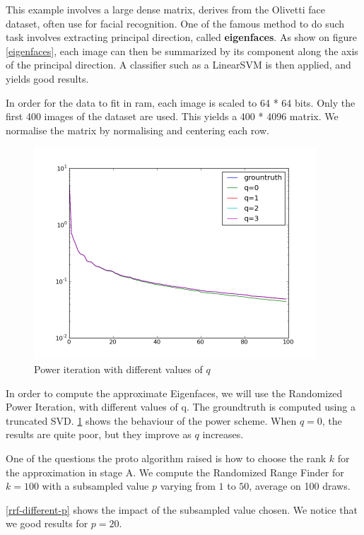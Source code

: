\documentclass[onecolumn,12pt]{article}
\begin{document}
This example involves a large dense matrix, derives from the Olivetti face
dataset, often use for facial recognition. One of the famous method to do such
task involves extracting principal direction, called \textbf{eigenfaces}. As
show on figure \ref{eigenfaces}, each image can then be summarized by its
component along the axis of the principal direction. A classifier such as a
LinearSVM is then applied, and yields good results.

In order for the data to fit in ram, each image is scaled to 64 * 64 bits.
Only the first 400 images of the dataset are used. This yields a 400 * 4096
matrix. We normalise the matrix by normalising and centering each row.

\begin{figure}[h]
\label{eigenfaces-computation}
\caption{Power iteration with different values of $q$}
\includegraphics[width=400px]{./images/face_results.png}
\end{figure}

In order to compute the approximate Eigenfaces, we will use the Randomized
Power Iteration, with different values of q. The groundtruth is computed using
a truncated SVD. \ref{eigenfaces-computation} shows the behaviour of the power
scheme. When $q=0$, the results are quite poor, but they improve as $q$
increases.

One of the questions the proto algorithm raised is how to choose the rank $k$
for the approximation in stage A. We compute the Randomized Range Finder for
$k=100$ with a subsampled value $p$ varying from $1$ to $50$, average on 100
draws.

\ref{rrf-different-p} shows the impact of the subsampled value chosen.
We notice that we good results for $p = 20$.
\end{document}
